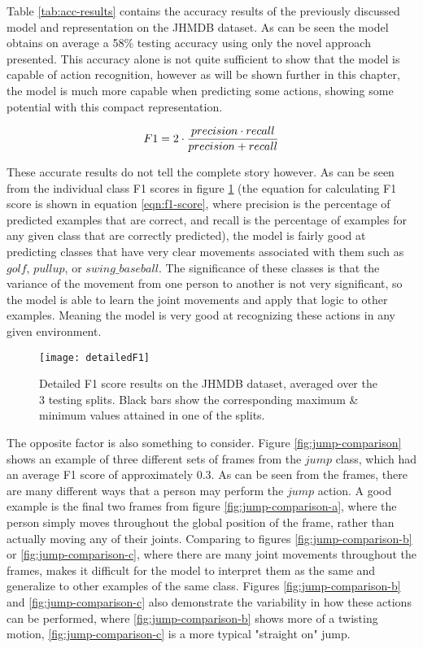 Table \ref{tab:acc-results} contains the accuracy results of the previously discussed model and representation on the JHMDB dataset. As can be seen the model obtains on average a 58\% testing accuracy using only the novel approach presented. This accuracy alone is not quite sufficient to show that the model is capable of action recognition, however as will be shown further in this chapter, the model is much more capable when predicting some actions, showing some potential with this compact representation.

\begin{equation}
	\label{eqn:f1-score}
	\centering
	F1 = 2 \cdot \frac{precision \cdot recall}{precision + recall}
\end{equation}

These accurate results do not tell the complete story however. As can be seen from the individual class F1 scores in figure \ref{fig:detailed-f1} (the equation for calculating F1 score is shown in equation \ref{eqn:f1-score}, where precision is the percentage of predicted examples that are correct, and recall is the percentage of examples for any given class that are correctly predicted), the model is fairly good at predicting classes that have very clear movements associated with them such as $golf$, $pullup$, or $swing\_baseball$. The significance of these classes is that the variance of the movement from one person to another is not very significant, so the model is able to learn the joint movements and apply that logic to other examples. Meaning the model is very good at recognizing these actions in any given environment.

\begin{figure}[ht]
	\texttt{[image: detailedF1]}
	\centering
	\caption{Detailed F1 score results on the JHMDB dataset, averaged over the 3 testing splits. Black bars show the corresponding maximum \& minimum values attained in one of the splits.}
	\label{fig:detailed-f1}
\end{figure}

The opposite factor is also something to consider. Figure \ref{fig:jump-comparison} shows an example of three different sets of frames from the $jump$ class, which had an average F1 score of approximately $0.3$. As can be seen from the frames, there are many different ways that a person may perform the $jump$ action. A good example is the final two frames from figure \ref{fig:jump-comparison-a}, where the person simply moves throughout the global position of the frame, rather than actually moving any of their joints. Comparing to figures \ref{fig:jump-comparison-b} or \ref{fig:jump-comparison-c}, where there are many joint movements throughout the frames, makes it difficult for the model to interpret them as the same and generalize to other examples of the same class. Figures \ref{fig:jump-comparison-b} and \ref{fig:jump-comparison-c} also demonstrate the variability in how these actions can be performed, where \ref{fig:jump-comparison-b} shows more of a twisting motion, \ref{fig:jump-comparison-c} is a more typical "straight on" jump.

